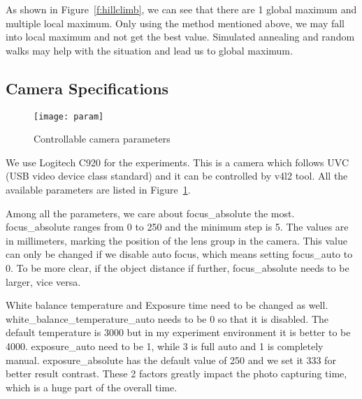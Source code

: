 As shown in Figure~\ref{f:hillclimb}, we can see that there are 1 global maximum and multiple local maximum.
Only using the method mentioned above, we may fall into local maximum and not get the best value.
Simulated annealing and random walks may help with the situation and lead us to global maximum.

\subsection{Camera Specifications}

\begin{figure}[tb!]
	\begin{center}
		\texttt{[image: param]}
	\end{center}
	\caption{Controllable camera parameters}
	\label{f:param}
\end{figure}

We use Logitech C920 for the experiments.
This is a camera which follows UVC (USB video device class standard) and it can be controlled by v4l2 tool.
All the available parameters are listed in Figure~\ref{f:param}.

Among all the parameters, we care about focus\_absolute the most.
focus\_absolute ranges from 0 to 250 and the minimum step is 5.
The values are in millimeters, marking the position of the lens group in the camera.
This value can only be changed if we disable auto focus, which means setting focus\_auto to 0.
To be more clear, if the object distance if further, focus\_absolute needs to be larger, vice versa.

White balance temperature and Exposure time need to be changed as well.
white\_balance\_temperature\_auto needs to be 0 so that it is disabled.
The default temperature is 3000 but in my experiment environment it is better to be 4000.
exposure\_auto need to be 1, while 3 is full auto and 1 is completely manual.
exposure\_absolute has the default value of 250 and we set it 333 for better result contrast.
These 2 factors greatly impact the photo capturing time, which is a huge part of the overall time.

